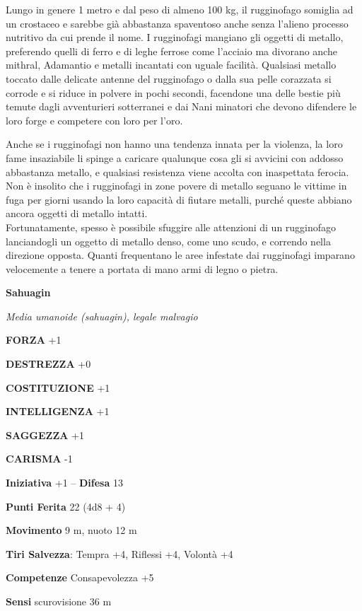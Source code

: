\begin{multicols}{2}
	Lungo in genere 1 metro e dal peso di almeno 100 kg, il rugginofago somiglia ad un crostaceo e sarebbe già abbastanza spaventoso anche senza l'alieno processo nutritivo da cui prende il nome. I rugginofagi mangiano gli oggetti di metallo, preferendo quelli di ferro e di leghe ferrose come l'acciaio ma divorano anche mithral, Adamantio e metalli incantati con uguale facilità. Qualsiasi metallo toccato dalle delicate antenne del rugginofago o dalla sua pelle corazzata si corrode e si riduce in polvere in pochi secondi, facendone una delle bestie più temute dagli avventurieri sotterranei e dai Nani minatori che devono difendere le loro forge e competere con loro per l'oro.

	Anche se i rugginofagi non hanno una tendenza innata per la violenza, la loro fame insaziabile li spinge a caricare qualunque cosa gli si avvicini con addosso abbastanza metallo, e qualsiasi resistenza viene accolta con inaspettata ferocia. Non è insolito che i rugginofagi in zone povere di metallo seguano le vittime in fuga per giorni usando la loro capacità di fiutare metalli, purché queste abbiano ancora oggetti di metallo intatti.\\
	Fortunatamente, spesso è possibile sfuggire alle attenzioni di un rugginofago lanciandogli un oggetto di metallo denso, come uno scudo, e correndo nella direzione opposta. Quanti frequentano le aree infestate dai rugginofagi imparano velocemente a tenere a portata di mano armi di legno o pietra.


	\medskip{}\textbf{Sahuagin}

	\textit{Media umanoide (sahuagin), legale malvagio}

	\textbf{FORZA} +1

	\textbf{DESTREZZA} +0

	\textbf{COSTITUZIONE} +1

	\textbf{INTELLIGENZA} +1

	\textbf{SAGGEZZA} +1

	\textbf{CARISMA} -1

	\textbf{Iniziativa} +1 -- \textbf{Difesa} 13

	\textbf{Punti Ferita} 22 (4d8 + 4)

	\textbf{Movimento} 9 m, nuoto 12 m

	\textbf{Tiri Salvezza}: Tempra +4, Riflessi +4, Volontà +4

	\textbf{Competenze} Consapevolezza +5

	\textbf{Sensi} scurovisione 36 m


\end{multicols}
